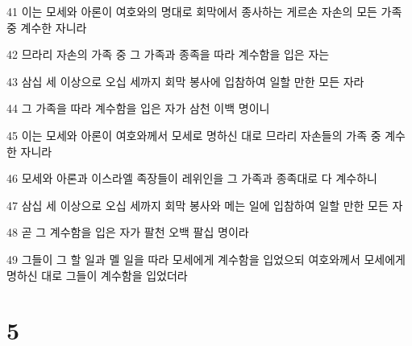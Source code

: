 \par 41 이는 모세와 아론이 여호와의 명대로 회막에서 종사하는 게르손 자손의 모든 가족 중 계수한 자니라
\par 42 므라리 자손의 가족 중 그 가족과 종족을 따라 계수함을 입은 자는
\par 43 삼십 세 이상으로 오십 세까지 회막 봉사에 입참하여 일할 만한 모든 자라
\par 44 그 가족을 따라 계수함을 입은 자가 삼천 이백 명이니
\par 45 이는 모세와 아론이 여호와께서 모세로 명하신 대로 므라리 자손들의 가족 중 계수한 자니라
\par 46 모세와 아론과 이스라엘 족장들이 레위인을 그 가족과 종족대로 다 계수하니
\par 47 삼십 세 이상으로 오십 세까지 회막 봉사와 메는 일에 입참하여 일할 만한 모든 자
\par 48 곧 그 계수함을 입은 자가 팔천 오백 팔십 명이라
\par 49 그들이 그 할 일과 멜 일을 따라 모세에게 계수함을 입었으되 여호와께서 모세에게 명하신 대로 그들이 계수함을 입었더라

\chapter{5}

